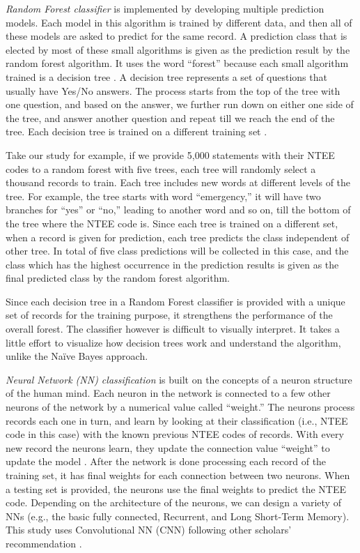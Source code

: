 \documentclass[11pt]{article}
\begin{document}
\textit{Random Forest classifier} is implemented by developing multiple prediction models. Each model in this algorithm is trained by different data, and then all of these models are asked to predict for the same record. A prediction class that is elected by most of these small algorithms is given as the prediction result by the random forest algorithm. It uses the word ``forest'' because each small algorithm trained is a decision tree \parencites[83]{QuinlanInductiondecisiontrees1986}. A decision tree represents a set of questions that usually have Yes/No answers. The process starts from the top of the tree with one question, and based on the answer, we further run down on either one side of the tree, and answer another question and repeat till we reach the end of the tree. Each decision tree is trained on a different training set \parencites[124]{BreimanBaggingpredictors1996}. 

Take our study for example, if we provide 5,000 statements with their NTEE codes to a random forest with five trees, each tree will randomly select a thousand records to train. Each tree includes new words at different levels of the tree. For example, the tree starts with word ``emergency,'' it will have two branches for ``yes'' or ``no,'' leading to another word and so on, till the bottom of the tree where the NTEE code is. Since each tree is trained on a different set, when a record is given for prediction, each tree predicts the class independent of other tree. In total of five class predictions will be collected in this case, and the class which has the highest occurrence in the prediction results is given as the final predicted class by the random forest algorithm. 

Since each decision tree in a Random Forest classifier is provided with a unique set of records for the training purpose, it strengthens the performance of the overall forest. The classifier however is difficult to visually interpret. It takes a little effort to visualize how decision trees work and understand the algorithm, unlike the Na\"ive Bayes approach.

\textit{Neural Network (NN) classification} is built on the concepts of a neuron structure of the human mind. Each neuron in the network is connected to a few other neurons of the network by a numerical value called ``weight.'' The neurons process records each one in turn, and learn by looking at their classification (i.e., NTEE code in this case) with the known previous NTEE codes of records. With every new record the neurons learn, they update the connection value ``weight'' to update the model \parencites[163]{CollobertUnifiedArchitectureNatural2008}. After the network is done processing each record of the training set, it has final weights for each connection between two neurons. When a testing set is provided, the neurons use the final weights to predict the NTEE code. Depending on the architecture of the neurons, we can design a variety of NNs (e.g., the basic fully connected, Recurrent, and Long Short-Term Memory). This study uses Convolutional NN (CNN) following other scholars' recommendation \parencite{ZhangSensitivityAnalysisPractitioners2015}.
\end{document}
